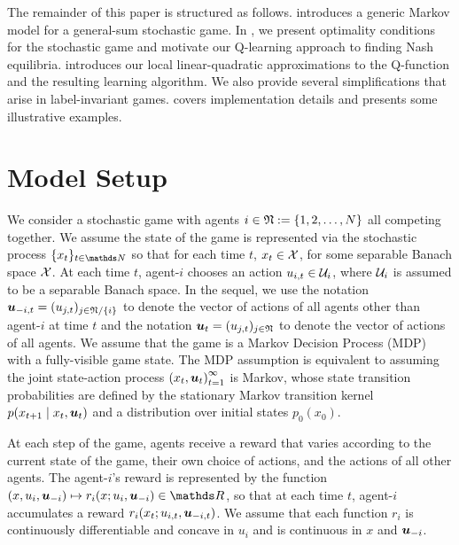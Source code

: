 \documentclass[onefignum,onetabnum]{siamonline171218}
\begin{document}
The remainder of this paper is structured as follows.  introduces a generic Markov model for a general-sum stochastic game. In , we present optimality conditions for the stochastic game and motivate our Q-learning approach to finding Nash equilibria.  introduces our local linear-quadratic approximations to the Q-function and the resulting learning algorithm. We also provide several simplifications that arise in label-invariant games.  covers implementation details and  presents some illustrative examples. 

\section{Model Setup}
\label{sec:Model-Setup}



We consider a stochastic game with  agents $i\in{\mathfrak{N}}:=\{1 , 2 , \dots , N\}$ all competing together. We assume  the state of the game is represented via the stochastic process $\{x_t\}_{t\in\NN}$ so that for each time $t$, $x_t \in \mathcal{X}$, for some separable Banach space $\mathcal{X}$. At each time $t$, agent-$i$ chooses an action $u_{i,t}\in\mathcal{U}_i$, where $\mathcal{U}_i$ is assumed to be a separable Banach space. In the sequel, we use the notation ${\bm{u}}_{-i,t}=(u_{j,t})_{ j\in{\mathfrak{N}}/\{i\}}$ to denote the vector of actions of all agents other than agent-$i$ at time $t$ and the notation ${\bm{u}}_{t}=(u_{j,t})_{ j\in{\mathfrak{N}}}$ to denote the vector of actions of all agents. We assume that the game is a Markov Decision Process (MDP) with a fully-visible game state. The MDP assumption is equivalent to assuming  the joint state-action process $\left(x_t, {\bm{u}}_t\right)_{t=1}^{\infty}$ is Markov, whose state transition probabilities are defined by the stationary Markov transition kernel $p(x_{t+1} \mid x_t, {\bm{u}}_t)$ and a distribution over initial states $p_0(x_0)$.

At each step of the game, agents receive a reward that varies according to the current state of the game, their own choice of actions, and the actions of all other agents. The agent-$i$'s reward is represented by the function $(x,u_i,\bu_{-i})\mapsto r_i(x;u_i,\bu_{-i})\in\R$, so that at each time $t$, agent-$i$ accumulates a reward $r_i(x_t;u_{i,t},{\bm{u}}_{-i,t})$. We assume that each function $r_i$ is continuously differentiable and concave in $u_i$ and is continuous in $x$ and ${\bm{u}}_{-i}$.
\end{document}
